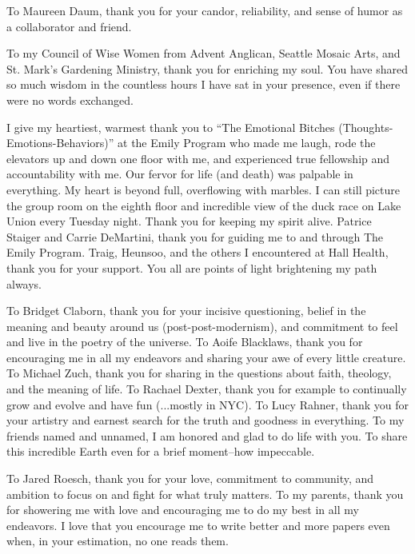     To Maureen Daum, thank you for your candor, reliability, and sense of humor as a collaborator
    and friend. 

    To my Council of Wise Women from Advent Anglican, Seattle Mosaic Arts, and
    St. Mark's Gardening Ministry, thank you for enriching my soul. You have
    shared so much wisdom in the countless hours I have sat in your presence,
    even if there were no words exchanged. 

    
    I give my heartiest, warmest thank you to ``The Emotional Bitches
    (Thoughts-Emotions-Behaviors)'' at the Emily Program who made me laugh, rode
    the elevators up and down one floor with me, and experienced true fellowship
    and accountability with me. Our fervor for life (and death) was palpable in
    everything. My heart is beyond full, overflowing with marbles. I can still
    picture the group room on the eighth floor and incredible view of the duck
    race on Lake Union every Tuesday night. Thank you for keeping my spirit
    alive. Patrice Staiger and Carrie DeMartini, thank you for guiding me to and
    through The Emily Program. Traig, Heunsoo, and the others I encountered at
    Hall Health, thank you for your support. You all are points of light
    brightening my path always. 
    
    To Bridget Claborn, thank you for your incisive questioning, belief in the
    meaning and beauty around us (post-post-modernism), and commitment to feel and
    live in the poetry of the universe. To Aoife Blacklaws, thank you for
    encouraging me in all my endeavors and sharing your awe of every little
    creature. To Michael Zuch, thank you for sharing in the questions about
    faith, theology, and the meaning of life. To Rachael Dexter, thank you for
    example to continually grow and evolve and have fun (...mostly in NYC). To
    Lucy Rahner, thank you for your artistry and earnest search for the truth and
    goodness in everything. To my friends named and unnamed,
    I am honored and glad to do life with you. To share this incredible Earth
    even for a brief moment--how impeccable. 

    To Jared Roesch, thank you for your love, commitment to community, and
    ambition to focus on and fight for what truly matters. To my parents, thank
    you for showering me with love and encouraging me to do my best in all my
    endeavors. I love that you encourage me to write better and more papers even
    when, in your estimation, no one reads them.

